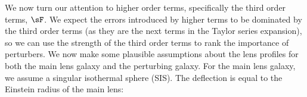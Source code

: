 We now turn our attention to higher order terms, specifically the third order terms, $\sF$. We expect the errors introduced by higher terms to be dominated by the third order terms (as they are the next terms in the Taylor series expansion), so we can use the strength of the third order terms to rank the importance of perturbers. We now make some plausible assumptions about the lens profiles for both the main lens galaxy and the perturbing galaxy. For the main lens galaxy, we assume a singular isothermal sphere (SIS). The deflection is equal to the Einstein radius of the main lens:
  